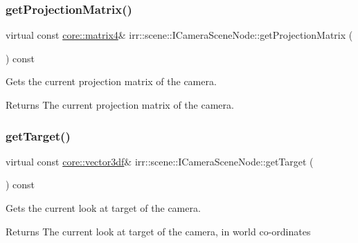 \subsubsection{\texorpdfstring{get\+Projection\+Matrix()}{getProjectionMatrix()}}
{\footnotesize\ttfamily virtual const \hyperlink{namespaceirr_1_1core_a73fa92e638c5ca97efd72da307cc9b65}{core\+::matrix4}\& irr\+::scene\+::\+I\+Camera\+Scene\+Node\+::get\+Projection\+Matrix (\begin{DoxyParamCaption}{ }\end{DoxyParamCaption}) const\hspace{0.3cm}{\ttfamily [pure virtual]}}



Gets the current projection matrix of the camera. 

\begin{DoxyReturn}{Returns}
The current projection matrix of the camera. 
\end{DoxyReturn}
\mbox{\label{classirr_1_1scene_1_1ICameraSceneNode_a3ce50433986650eea15b20e4ed19c952}} 
\subsubsection{\texorpdfstring{get\+Target()}{getTarget()}}
{\footnotesize\ttfamily virtual const \hyperlink{namespaceirr_1_1core_a06f169d08b5c429f5575acb7edbad811}{core\+::vector3df}\& irr\+::scene\+::\+I\+Camera\+Scene\+Node\+::get\+Target (\begin{DoxyParamCaption}{ }\end{DoxyParamCaption}) const\hspace{0.3cm}{\ttfamily [pure virtual]}}



Gets the current look at target of the camera. 

\begin{DoxyReturn}{Returns}
The current look at target of the camera, in world co-\/ordinates 
\end{DoxyReturn}
\mbox{\label{classirr_1_1scene_1_1ICameraSceneNode_a343be24b2c43db7580127229db2dec6a}} 
